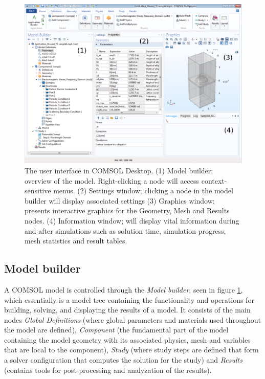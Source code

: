 \begin{figure}[h]
    \centering
    \includegraphics[width=\linewidth]{figures/Ch3/UI4.png}
    \caption{The user interface in COMSOL Desktop. (1) Model builder; overview of the model. Right-clicking a node will access context-sensitive menus. (2) Settings window; clicking a node in the model builder will display associated settings (3) Graphics window; presents interactive graphics for the Geometry, Mesh and Results nodes. (4) Information window; will display vital information during and after simulations such as solution time, simulation progress, mesh statistics and result tables.}
    \label{fig:comsol_ui}
\end{figure}

\subsection{Model builder}
\label{sec:comsol_model_builder}
A COMSOL model is controlled through the \emph{Model builder}, seen in figure \ref{fig:comsol_ui}, which essentially is a model tree containing the functionality and operations for building, solving, and displaying the results of a model. It consists of the main nodes \emph{Global Definitions} (where global parameters and materials used throughout the model are defined), \emph{Component} (the fundamental part of the model containing the model geometry with its associated physics, mesh and variables that are local to the component), \emph{Study} (where study steps are defined that form a solver configuration that computes the solution for the study) and \emph{Results} (contains tools for post-processing and analyzation of the results).


